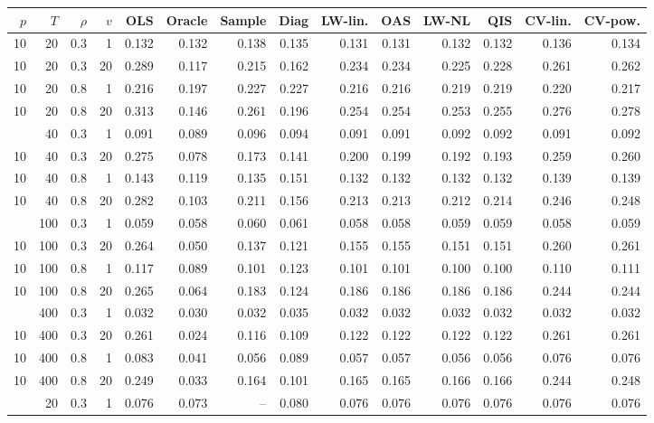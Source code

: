 \begin{tabular}{@{}rrrrrrrrrrrrrr@{}}
\toprule
$p$ & $T$ & $\rho$ & $v$ & OLS & Oracle & Sample & Diag & LW-lin. & OAS & LW-NL & QIS & CV-lin. & CV-pow. \\
\midrule
10 & 20 & 0.3 & 1 & 0.132 & 0.132 & 0.138 & 0.135 & 0.131 & 0.131 & 0.132 & 0.132 & 0.136 & 0.134 \\
10 & 20 & 0.3 & 20 & 0.289 & 0.117 & 0.215 & 0.162 & 0.234 & 0.234 & 0.225 & 0.228 & 0.261 & 0.262 \\
10 & 20 & 0.8 & 1 & 0.216 & 0.197 & 0.227 & 0.227 & 0.216 & 0.216 & 0.219 & 0.219 & 0.220 & 0.217 \\
10 & 20 & 0.8 & 20 & 0.313 & 0.146 & 0.261 & 0.196 & 0.254 & 0.254 & 0.253 & 0.255 & 0.276 & 0.278 \\
\addlinespace[1pt]
10 & 40 & 0.3 & 1 & 0.091 & 0.089 & 0.096 & 0.094 & 0.091 & 0.091 & 0.092 & 0.092 & 0.091 & 0.092 \\
10 & 40 & 0.3 & 20 & 0.275 & 0.078 & 0.173 & 0.141 & 0.200 & 0.199 & 0.192 & 0.193 & 0.259 & 0.260 \\
10 & 40 & 0.8 & 1 & 0.143 & 0.119 & 0.135 & 0.151 & 0.132 & 0.132 & 0.132 & 0.132 & 0.139 & 0.139 \\
10 & 40 & 0.8 & 20 & 0.282 & 0.103 & 0.211 & 0.156 & 0.213 & 0.213 & 0.212 & 0.214 & 0.246 & 0.248 \\
\addlinespace[1pt]
10 & 100 & 0.3 & 1 & 0.059 & 0.058 & 0.060 & 0.061 & 0.058 & 0.058 & 0.059 & 0.059 & 0.058 & 0.059 \\
10 & 100 & 0.3 & 20 & 0.264 & 0.050 & 0.137 & 0.121 & 0.155 & 0.155 & 0.151 & 0.151 & 0.260 & 0.261 \\
10 & 100 & 0.8 & 1 & 0.117 & 0.089 & 0.101 & 0.123 & 0.101 & 0.101 & 0.100 & 0.100 & 0.110 & 0.111 \\
10 & 100 & 0.8 & 20 & 0.265 & 0.064 & 0.183 & 0.124 & 0.186 & 0.186 & 0.186 & 0.186 & 0.244 & 0.244 \\
\addlinespace[1pt]
10 & 400 & 0.3 & 1 & 0.032 & 0.030 & 0.032 & 0.035 & 0.032 & 0.032 & 0.032 & 0.032 & 0.032 & 0.032 \\
10 & 400 & 0.3 & 20 & 0.261 & 0.024 & 0.116 & 0.109 & 0.122 & 0.122 & 0.122 & 0.122 & 0.261 & 0.261 \\
10 & 400 & 0.8 & 1 & 0.083 & 0.041 & 0.056 & 0.089 & 0.057 & 0.057 & 0.056 & 0.056 & 0.076 & 0.076 \\
10 & 400 & 0.8 & 20 & 0.249 & 0.033 & 0.164 & 0.101 & 0.165 & 0.165 & 0.166 & 0.166 & 0.244 & 0.248 \\
\addlinespace[1pt]
30 & 20 & 0.3 & 1 & 0.076 & 0.073 & -- & 0.080 & 0.076 & 0.076 & 0.076 & 0.076 & 0.076 & 0.076 \\

\end{tabular}
